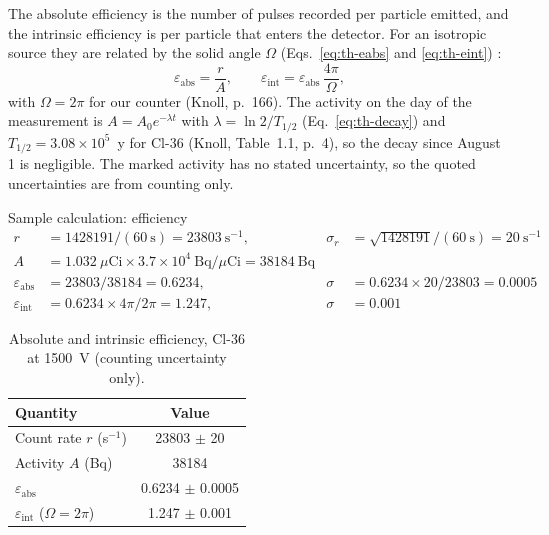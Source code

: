 \documentclass[12pt]{article}
\begin{document}
The absolute efficiency is the number of pulses recorded per particle emitted, and the intrinsic efficiency is per particle that enters the detector. For an isotropic source they are related by the solid angle $\Omega$ (Eqs.~\ref{eq:th-eabs} and \ref{eq:th-eint}) \cite{knoll}:
\begin{equation}
\varepsilon_{\text{abs}} = \frac{r}{A}, \qquad \varepsilon_{\text{int}} = \varepsilon_{\text{abs}}\,\frac{4\pi}{\Omega},
\end{equation}
with $\Omega = 2\pi$ for our counter (Knoll, p.~166). The activity on the day of the measurement is $A = A_0 e^{-\lambda t}$ with $\lambda = \ln 2/T_{1/2}$ (Eq.~\ref{eq:th-decay}) and $T_{1/2} = 3.08\times10^5$~y for Cl-36 (Knoll, Table~1.1, p.~4), so the decay since August 1 is negligible. The marked activity has no stated uncertainty, so the quoted uncertainties are from counting only.

\begin{samplecalc}{Sample calculation: efficiency}
\begin{align*}
r &= 1428191/(60\ \text{s}) = 23803\ \text{s}^{-1}, & \sigma_r &= \sqrt{1428191}/(60\ \text{s}) = 20\ \text{s}^{-1}\\
A &= 1.032\ \mu\text{Ci} \times 3.7\times10^{4}\ \text{Bq}/\mu\text{Ci} = 38184\ \text{Bq} & &\\
\varepsilon_{\text{abs}} &= 23803/38184 = 0.6234, & \sigma &= 0.6234 \times 20/23803 = 0.0005\\
\varepsilon_{\text{int}} &= 0.6234 \times 4\pi/2\pi = 1.247, & \sigma &= 0.001
\end{align*}
\end{samplecalc}

\begin{table}[!htbp]
\centering\small
\begin{tabular}{lc}
\toprule
\textbf{Quantity} & \textbf{Value} \\
\midrule
Count rate $r$ (s$^{-1}$) & 23803 $\pm$ 20 \\
Activity $A$ (Bq) & 38184 \\
$\varepsilon_{\text{abs}}$ & 0.6234 $\pm$ 0.0005 \\
$\varepsilon_{\text{int}}$ ($\Omega = 2\pi$) & 1.247 $\pm$ 0.001 \\
\bottomrule
\end{tabular}
\caption{Absolute and intrinsic efficiency, Cl-36 at 1500~V (counting uncertainty only).}
\label{tab:eff}
\end{table}
\end{document}
